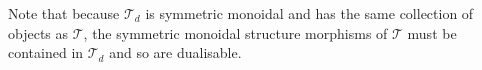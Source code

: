 \documentclass[11pt,letterpaper]{article}
\theoremstyle{plain}
\theoremstyle{definition}
\newtheorem{definition}[theorem]{Definition}
\newtheorem{remark}[theorem]{Remark}
\newcommand{\C}{\mathscr{C}}
\newcommand{\T}{\mathscr{T}}
\newcommand{\op}{\mathrm{op}}
\newcommand{\todo}[1]{\textcolor{red}{\small #1}}
\begin{document}


Note that because $\T_d$ is symmetric monoidal and has the same collection of objects as $\T$, the symmetric monoidal structure morphisms of $\T$ must be contained in $\T_d$ and so are dualisable.
\end{document}
